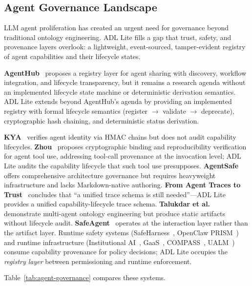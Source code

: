 \subsection{Agent Governance Landscape}\label{subsec:agent-governance}

LLM agent proliferation has created an urgent need for governance beyond traditional ontology engineering. ADL Lite fills a gap that trust, safety, and provenance layers overlook: a lightweight, event-sourced, tamper-evident registry of agent capabilities and their lifecycle states.

\textbf{AgentHub}~\cite{agenthub2025} proposes a registry layer for agent sharing with discovery, workflow integration, and lifecycle transparency, but it remains a research agenda without an implemented lifecycle state machine or deterministic derivation semantics. ADL Lite extends beyond AgentHub's agenda by providing an implemented registry with formal lifecycle semantics (register $ \to $ validate $ \to $ deprecate), cryptographic hash chaining, and deterministic status derivation.\par
\textbf{KYA}~\cite{kya2025} verifies agent identity via HMAC chains but does not audit capability lifecycles. \textbf{Zhou}~\cite{zhou2026governance} proposes cryptographic binding and reproducibility verification for agent tool use, addressing tool-call provenance at the invocation level; ADL Lite audits the capability lifecycle that such tool use presupposes. \textbf{AgentSafe}~\cite{agentsafe2025} offers comprehensive architecture governance but requires heavyweight infrastructure and lacks Markdown-native authoring. \textbf{From Agent Traces to Trust}~\cite{agenttraces2025} concludes that ``a unified trace schema is still needed''---ADL Lite provides a unified capability-lifecycle trace schema. \textbf{Talukdar et al.}~\cite{talukdar2025} demonstrate multi-agent ontology engineering but produce static artifacts without lifecycle audit. \textbf{SafeAgent}~\cite{safeagent2025} operates at the interaction layer rather than the artifact layer. Runtime safety systems (SafeHarness~\cite{safeharness2026}, OpenClaw PRISM~\cite{openclaw_prism2026}) and runtime infrastructure (Institutional AI~\cite{institutional_ai2026}, GaaS~\cite{gaas2025}, COMPASS~\cite{compass2026}, UALM~\cite{ualm2026}) consume capability provenance for policy decisions; ADL Lite occupies the \emph{registry layer} between permissioning and runtime enforcement.

Table~\ref{tab:agent-governance} compares these systems.

